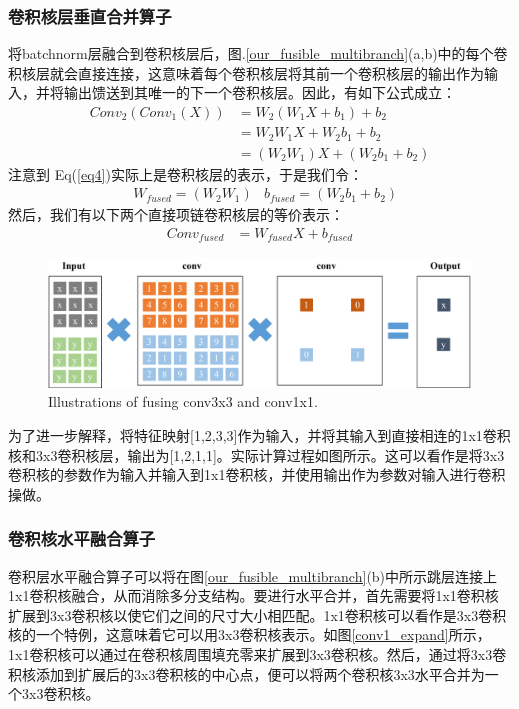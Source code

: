 \subsubsection{卷积核层垂直合并算子}
\label{sub2}
将batchnorm层融合到卷积核层后，图.\ref{our_fusible_multibranch}(a,b)中的每个卷积核层就会直接连接，这意味着每个卷积核层将其前一个卷积核层的输出作为输入，并将输出馈送到其唯一的下一个卷积核层。因此，有如下公式成立：
\begin{equation}
\begin{aligned}
Conv_2(Conv_1(X)) &= W_2(W_1X+b_1) + b_2 \\
&= W_2W_1X + W_2b_1 + b_2 \\
&= (W_2W_1)X + (W_2b_1 + b_2)
\end{aligned}
\label{eq4}
\end{equation} 
注意到 Eq(\ref{eq4})实际上是卷积核层的表示，于是我们令：
\begin{equation}
\begin{aligned}
&W_{fused} = (W_2W_1) &b_{fused} = (W_2b_1 + b_2)
\end{aligned}
\end{equation}
然后，我们有以下两个直接项链卷积核层的等价表示：
\begin{equation}
\begin{aligned}
Conv_{fused} &= W_{fused}X + b_{fused}
\end{aligned}
\end{equation} 

\begin{figure}[h]
	\centering
	\includegraphics[width=1\textwidth]{figures/Jresnet/FIG5_TII-21-2603.pdf}
	\caption{Illustrations of fusing conv3x3 and conv1x1.}
	\label{fuse_131}
\end{figure}
为了进一步解释，将特征映射[1,2,3,3]作为输入，并将其输入到直接相连的1x1卷积核和3x3卷积核层，输出为[1,2,1,1]。实际计算过程如图所示。这可以看作是将3x3卷积核的参数作为输入并输入到1x1卷积核，并使用输出作为参数对输入进行卷积操做。

\subsubsection{卷积核水平融合算子}
\label{sub3}
卷积层水平融合算子可以将在图\ref{our_fusible_multibranch}(b)中所示跳层连接上1x1卷积核融合，从而消除多分支结构。要进行水平合并，首先需要将1x1卷积核扩展到3x3卷积核以使它们之间的尺寸大小相匹配。1x1卷积核可以看作是3x3卷积核的一个特例，这意味着它可以用3x3卷积核表示。如图\ref{conv1_expand}所示，1x1卷积核可以通过在卷积核周围填充零来扩展到3x3卷积核。然后，通过将3x3卷积核添加到扩展后的3x3卷积核的中心点，便可以将两个卷积核3x3水平合并为一个3x3卷积核。


